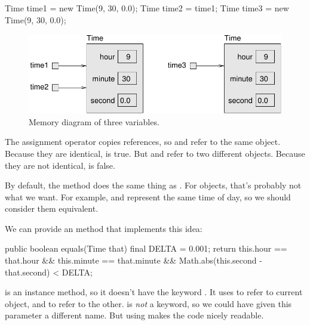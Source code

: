 \begin{code}
Time time1 = new Time(9, 30, 0.0);
Time time2 = time1;
Time time3 = new Time(9, 30, 0.0);
\end{code}


\begin{figure}[!ht]
\begin{center}
\includegraphics{figs/time2.pdf}
\caption{Memory diagram of three  variables.}
\label{fig.time2}
\end{center}
\end{figure}

The assignment operator copies references, so  and  refer to the same object.
Because they are identical,  is true.
But  and  refer to two different objects.
Because they are not identical,  is false.

By default, the  method does the same thing as \java{==}.
For  objects, that's probably not what we want.
For example,  and  represent the same time of day, so we should consider them equivalent.


We can provide an  method that implements this idea:

\begin{code}
public boolean equals(Time that) {
    final DELTA = 0.001;
    return this.hour == that.hour
        && this.minute == that.minute
        && Math.abs(this.second - that.second) < DELTA;
}
\end{code}

 is an instance method, so it doesn't have the keyword .
It uses  to refer to current object, and  to refer to the other.
 is {\em not} a keyword, so we could have given this parameter a different name.
But using  makes the code nicely readable.

